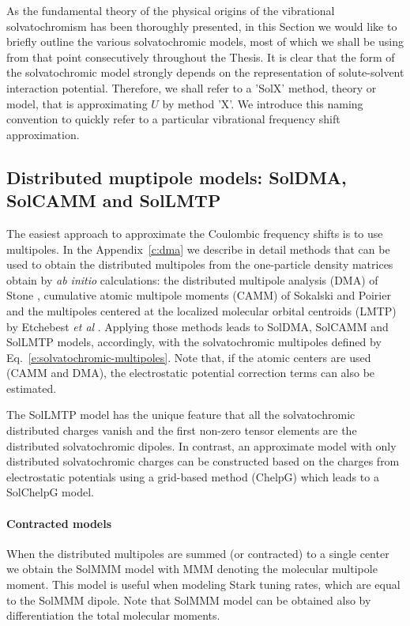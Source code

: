 \documentclass[a4paper,titlepage,twoside,fleqn,12pt]{book}
\begin{document}
\begin{refsection}
As the fundamental theory of the physical origins of the vibrational
solvatochromism has been thoroughly presented, 
in this Section we would like to briefly outline
the various solvatochromic models, most of which 
we shall be using from that point 
consecutively throughout the Thesis. It is clear
that the form of the solvatochromic model strongly depends
on the representation of solute\hyp{}solvent interaction potential.
Therefore, we shall refer to
a 'SolX' method, theory or model, that is approximating $U$
by method 'X'. We introduce this naming convention to quickly refer to a
particular vibrational frequency shift approximation. 


\subsection{Distributed muptipole models: SolDMA, SolCAMM and SolLMTP}

The easiest approach to approximate the Coulombic frequency shifts
is to use multipoles. In the Appendix~\ref{c:dma}
we describe in detail methods that can be used to obtain
the distributed multipoles from the one\hyp{}particle density matrices
obtain by \emph{ab initio} calculations: the distributed multipole analysis (DMA) of
Stone \citep{Stone.JCTC.2005}, cumulative atomic multipole moments (CAMM)
of Sokalski and Poirier \citep{Sokalski.Poirier.CPL.1983}
and the multipoles centered at the localized molecular orbital centroids (LMTP)
by Etchebest \emph{et al} \citep{Etchebest.Lavery.Pullman.TheorChimActa.1982}.
Applying those methods leads to SolDMA, SolCAMM and SolLMTP models, accordingly, with the 
solvatochromic multipoles defined by Eq.~\eqref{e:solvatochromic-multipoles}. 
Note that, if the atomic centers are used (CAMM and DMA), the electrostatic potential
correction terms can also be estimated.

The SolLMTP model has the unique feature that all the solvatochromic 
distributed charges vanish and the first non\hyp{}zero tensor elements
are the distributed solvatochromic dipoles. In contrast, an approximate model 
with only distributed solvatochromic charges can be constructed based on the
charges from electrostatic potentials using a grid\hyp{}based 
method\citep{Breneman.Wiberg.JCC.1990} (ChelpG)
which leads to a SolChelpG model.
%
\paragraph{Contracted models}
When the distributed multipoles are summed (or contracted)
to a single center we obtain the SolMMM model with MMM denoting 
the molecular multipole moment. This model is useful when
modeling Stark tuning rates, which are equal to
the SolMMM dipole. Note that SolMMM model can be obtained
also by differentiation the total molecular moments.


\end{refsection}
\end{document}
